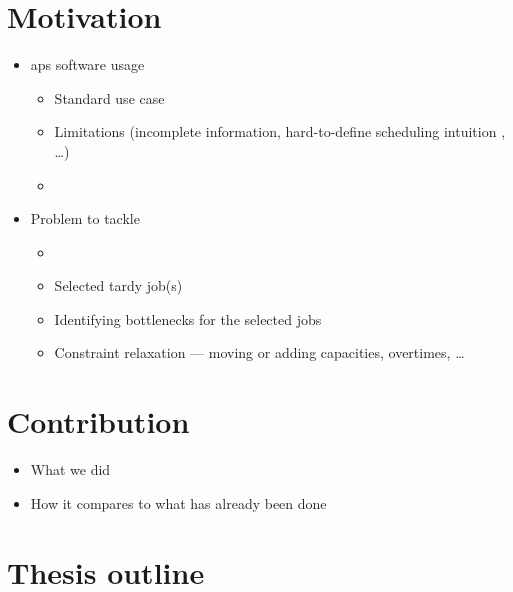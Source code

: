  \label{chap:introduction}

\section*{Motivation} \label{sec:introduction/motivation}

\begin{itemize}
    \item \ac{aps} software usage
    \begin{itemize}
        \item Standard use case
        \item Limitations (incomplete information, hard-to-define scheduling intuition , \dots)
        \item {}
    \end{itemize}

    \item Problem to tackle
    \begin{itemize}
        \item {}
        \item Selected tardy job(s)
        \item Identifying bottlenecks for the selected jobs
        \item Constraint relaxation --- moving or adding capacities, overtimes, \dots
    \end{itemize}
\end{itemize}

\section*{Contribution} \label{sec:introduction/contribution}

\begin{itemize}
    \item What we did
    \item How it compares to what has already been done
\end{itemize}

\section*{Thesis outline} \label{sec:introduction/thesis-outline}

